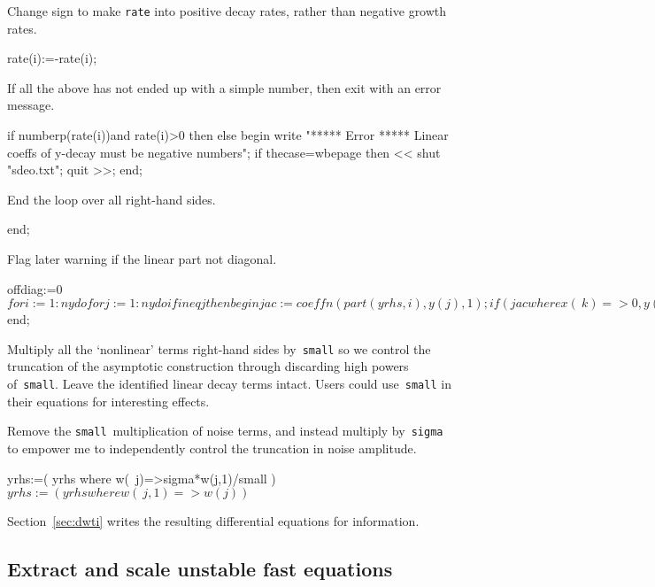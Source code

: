 \documentclass[11pt,a5paper]{article}
\begin{document}
Change sign to make \verb|rate| into positive decay rates, rather than negative growth rates.
\begin{reduce}
  rate(i):=-rate(i); 
\end{reduce}

If all the above has not ended up with a simple number, then exit with an error message. 
\begin{reduce}
  if numberp(rate(i))and rate(i)>0 then
  else begin 
    write "***** Error *****
    Linear coeffs of y-decay must be negative numbers";
    if thecase=wbepage then <<
      shut "sdeo.txt"; quit >>;
  end;
\end{reduce}

End the loop over all right-hand sides.
\begin{reduce}
end;
\end{reduce}

Flag later warning if the linear part not diagonal.
\begin{reduce}
offdiag:=0$
for i:=1:ny do for j:=1:ny do if i neq j then begin
  jac:=coeffn(part(yrhs,i),y(j),1);
  if (jac where {x(~k)=>0,y(~k)=>0,z(~k)=>0,w(~k)=>0}) neq 0 
  then offdiag:=1$
end;
\end{reduce}

Multiply all the `nonlinear' terms right-hand sides by~\verb|small| so we control the truncation of the asymptotic construction through discarding high powers of~\verb|small|.
Leave the identified linear decay terms intact.
Users could use~\verb|small| in their equations for interesting effects. 

Remove the \verb|small|~multiplication of noise terms, and instead multiply by~\verb|sigma| to empower me to independently control the truncation in noise amplitude.
\begin{reduce}
yrhs:=( yrhs where w(~j)=>sigma*w(j,1)/small )$
yrhs:=( yrhs where w(~j,1)=>w(j) )$
\end{reduce}

Section~\ref{sec:dwti} writes the resulting differential equations for information.



\subsection{Extract and scale unstable fast equations}
\end{document}
